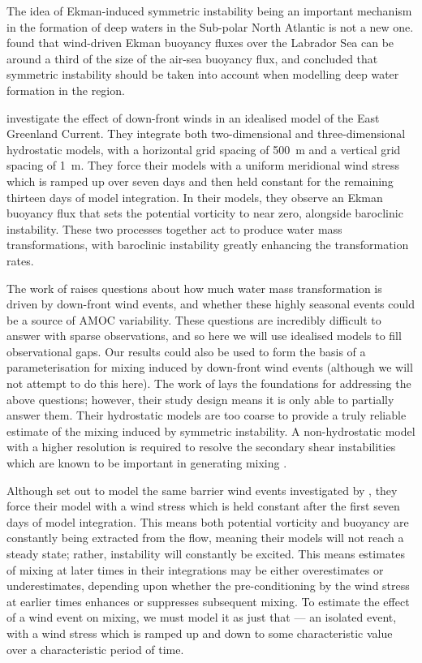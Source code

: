 The idea of Ekman-induced symmetric instability being an important mechanism in the formation of deep waters in the Sub-polar North Atlantic is not a new one. \citet{Straneo2002} found that wind-driven Ekman buoyancy fluxes over the Labrador Sea can be around a third of the size of the air-sea buoyancy flux, and concluded that symmetric instability should be taken into account when modelling deep water formation in the region. 

\citet{Spall2016} investigate the effect of down-front winds in an idealised model of the East Greenland Current. They integrate both two-dimensional and three-dimensional hydrostatic models, with a horizontal grid spacing of 500~m and a vertical grid spacing of 1~m. They force their models with a uniform meridional wind stress which is ramped up over seven days and then held constant for the remaining thirteen days of model integration. In their models, they observe an Ekman buoyancy flux that sets the potential vorticity to near zero, alongside baroclinic instability. These two processes together act to produce water mass transformations, with baroclinic instability greatly enhancing the transformation rates.

The work of \citet{LeBras2022} raises questions about how much water mass transformation is driven by down-front wind events, and whether these highly seasonal events could be a source of AMOC variability. These questions are incredibly difficult to answer with sparse observations, and so here we will use idealised models to fill observational gaps. Our results could also be used to form the basis of a parameterisation for mixing induced by down-front wind events (although we will not attempt to do this here). The work of \citet{Spall2016} lays the foundations for addressing the above questions; however, their study design means it is only able to partially answer them. Their hydrostatic models are too coarse to provide a truly reliable estimate of the mixing induced by symmetric instability. A non-hydrostatic model with a higher resolution is required to resolve the secondary shear instabilities which are known to be important in generating mixing \citep{Taylor2009}.

Although \citet{Spall2016} set out to model the same barrier wind events investigated by \citet{LeBras2022}, they force their model with a wind stress which is held constant after the first seven days of model integration. This means both potential vorticity and buoyancy are constantly being extracted from the flow, meaning their models will not reach a steady state; rather, instability will constantly be excited. This means estimates of mixing at later times in their integrations may be either overestimates or underestimates, depending upon whether the pre-conditioning by the wind stress at earlier times enhances or suppresses subsequent mixing. To estimate the effect of a wind event on mixing, we must model it as just that --- an isolated event, with a wind stress which is ramped up and down to some characteristic value over a characteristic period of time.

